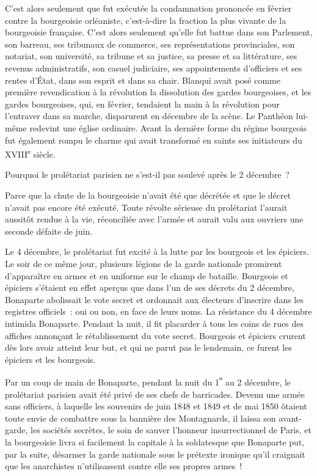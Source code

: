 \documentclass[french,twoside]{book} %
\begin{document}
C’est alors seulement que fut exécutée la condamnation prononcée en février contre la bourgeoisie orléaniste, c’est-à-dire la fraction la plus vivante de la bourgeoisie française. C’est alors seulement qu’elle fut battue dans son Parlement, son barreau, ses tribunaux de commerce, ses représentations provinciales, son notariat, son université, sa tribune et sa justice, sa presse et sa littérature, ses revenus administratifs, son casuel judiciaire, ses appointements d’officiers et ses rentes d’État, dans son esprit et dans sa chair. Blanqui avait posé comme première revendication à la révolution la dissolution des gardes bourgeoises, et les gardes bourgeoises, qui, en février, tendaient la main à la révolution pour l’entraver dans sa marche, disparurent en décembre de la scène. Le Panthéon lui-même redevint une église ordinaire. Avant la dernière forme du régime bourgeois fut également rompu le charme qui avait transformé en saints ses initiateurs du XVIII\textsuperscript{e} siècle.\par
Pourquoi le prolétariat parisien ne s’est-il pas soulevé après le 2 décembre ?\par
Parce que la chute de la bourgeoisie n’avait été que décrétée et que le décret n’avait pas encore été exécuté. Toute révolte sérieuse du prolétariat l’aurait aussitôt rendue à la vie, réconciliée avec l’armée et aurait valu aux ouvriers une seconde défaite de juin.\par
Le 4 décembre, le prolétariat fut excité à la lutte par les bourgeois et les épiciers. Le soir de ce même jour, plusieurs légions de la garde nationale promirent d’apparaître en armes et en uniforme sur le champ de bataille. Bourgeois et épiciers s’étaient en effet aperçus que dans l’un de ses décrets du 2 décembre, Bonaparte abolissait le vote secret et ordonnait aux électeurs d’inscrire dans les registres officiels : oui ou non, en face de leurs noms. La résistance du 4 décembre intimida Bonaparte. Pendant la nuit, il fit placarder à tous les coins de rues des affiches annonçant le rétablissement du vote secret. Bourgeois et épiciers crurent dès lors avoir atteint leur but, et qui ne parut pas le lendemain, ce furent les épiciers et les bourgeois.\par
Par un coup de main de Bonaparte, pendant la nuit du 1\textsuperscript{ᵉʳ} au 2 décembre, le prolétariat parisien avait été privé de ses chefs de barricades. Devenu une armée sans officiers, à laquelle les souvenirs de juin 1848 et 1849 et de mai 1850 ôtaient toute envie de combattre sous la bannière des Montagnards, il laissa son avant-garde, les sociétés secrètes, le soin de sauver l’honneur insurrectionnel de Paris, et la bourgeoisie livra si facilement la capitale à la soldatesque que Bonaparte put, par la suite, désarmer la garde nationale sous le prétexte ironique qu’il craignait que les anarchistes n’utilisassent contre elle ses propres armes !\par
\end{document}
